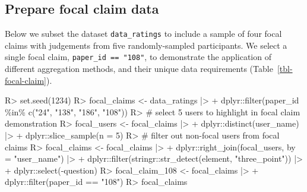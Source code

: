 \documentclass[
  11pt,
  a4paper,
]{article}
\newenvironment{Shaded}{\begin{snugshade}}{\end{snugshade}}
\newcommand{\AttributeTok}[1]{\textcolor[rgb]{0.40,0.45,0.13}{#1}}
\newcommand{\CommentTok}[1]{\textcolor[rgb]{0.37,0.37,0.37}{#1}}
\newcommand{\DecValTok}[1]{\textcolor[rgb]{0.68,0.00,0.00}{#1}}
\newcommand{\FunctionTok}[1]{\textcolor[rgb]{0.28,0.35,0.67}{#1}}
\newcommand{\NormalTok}[1]{\textcolor[rgb]{0.00,0.23,0.31}{#1}}
\newcommand{\OtherTok}[1]{\textcolor[rgb]{0.00,0.23,0.31}{#1}}
\newcommand{\SpecialCharTok}[1]{\textcolor[rgb]{0.37,0.37,0.37}{#1}}
\newcommand{\StringTok}[1]{\textcolor[rgb]{0.13,0.47,0.30}{#1}}
\begin{document}
\subsection{Prepare focal claim data}\label{sec-focal-claims}

Below we subset the dataset \texttt{data\_ratings} to include a sample
of four focal claims with judgements from five randomly-sampled
participants. We select a single focal claim,
\texttt{paper\_id\ ==\ "108"}, to demonstrate the application of
different aggregation methods, and their unique data requirements
(Table~\ref{tbl-focal-claim}).

\begin{Shaded}
\begin{Highlighting}[]
\NormalTok{R}\SpecialCharTok{\textgreater{}} \FunctionTok{set.seed}\NormalTok{(}\DecValTok{1234}\NormalTok{)}
\NormalTok{R}\SpecialCharTok{\textgreater{}}\NormalTok{ focal\_claims }\OtherTok{\textless{}{-}}\NormalTok{ data\_ratings }\SpecialCharTok{|\textgreater{}}
\SpecialCharTok{+}\NormalTok{    dplyr}\SpecialCharTok{::}\FunctionTok{filter}\NormalTok{(paper\_id }\SpecialCharTok{\%in\%} \FunctionTok{c}\NormalTok{(}\StringTok{"24"}\NormalTok{, }\StringTok{"138"}\NormalTok{, }\StringTok{"186"}\NormalTok{, }\StringTok{"108"}\NormalTok{))}
\NormalTok{R}\SpecialCharTok{\textgreater{}} \CommentTok{\# select 5 users to highlight in focal claim demonstration}
\NormalTok{R}\SpecialCharTok{\textgreater{}}\NormalTok{ focal\_users }\OtherTok{\textless{}{-}}\NormalTok{ focal\_claims }\SpecialCharTok{|\textgreater{}}
\SpecialCharTok{+}\NormalTok{    dplyr}\SpecialCharTok{::}\FunctionTok{distinct}\NormalTok{(user\_name) }\SpecialCharTok{|\textgreater{}}
\SpecialCharTok{+}\NormalTok{    dplyr}\SpecialCharTok{::}\FunctionTok{slice\_sample}\NormalTok{(}\AttributeTok{n =} \DecValTok{5}\NormalTok{)}
\NormalTok{R}\SpecialCharTok{\textgreater{}} \CommentTok{\# filter out non{-}focal users from focal claims}
\NormalTok{R}\SpecialCharTok{\textgreater{}}\NormalTok{ focal\_claims }\OtherTok{\textless{}{-}}\NormalTok{ focal\_claims }\SpecialCharTok{|\textgreater{}}
\SpecialCharTok{+}\NormalTok{    dplyr}\SpecialCharTok{::}\FunctionTok{right\_join}\NormalTok{(focal\_users, }\AttributeTok{by =} \StringTok{"user\_name"}\NormalTok{) }\SpecialCharTok{|\textgreater{}}
\SpecialCharTok{+}\NormalTok{    dplyr}\SpecialCharTok{::}\FunctionTok{filter}\NormalTok{(stringr}\SpecialCharTok{::}\FunctionTok{str\_detect}\NormalTok{(element, }\StringTok{"three\_point"}\NormalTok{)) }\SpecialCharTok{|\textgreater{}}
\SpecialCharTok{+}\NormalTok{    dplyr}\SpecialCharTok{::}\FunctionTok{select}\NormalTok{(}\SpecialCharTok{{-}}\NormalTok{question)}
\NormalTok{R}\SpecialCharTok{\textgreater{}}\NormalTok{ focal\_claim\_108 }\OtherTok{\textless{}{-}}\NormalTok{ focal\_claims }\SpecialCharTok{|\textgreater{}}
\SpecialCharTok{+}\NormalTok{    dplyr}\SpecialCharTok{::}\FunctionTok{filter}\NormalTok{(paper\_id }\SpecialCharTok{==} \StringTok{"108"}\NormalTok{)}
\NormalTok{R}\SpecialCharTok{\textgreater{}}\NormalTok{ focal\_claims}
\end{Highlighting}
\end{Shaded}
\end{document}
